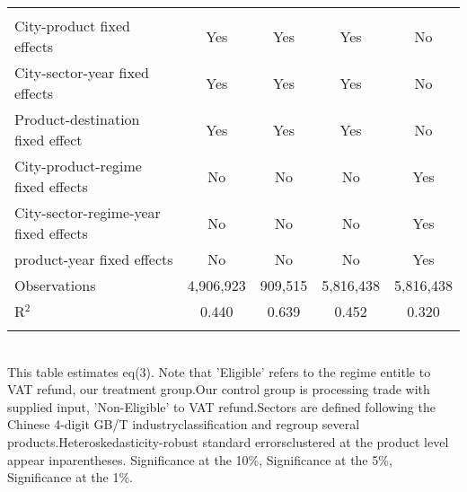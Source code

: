 \documentclass[preview]{standalone}
\begin{document}
\begin{table}[!htbp]
\begin{adjustbox}{width=\textwidth, totalheight=\baselineskip,keepaspectratio}
\begin{tabular}{@{\extracolsep{5pt}}lcccc}
 \hline \\[-1.8ex] 
City-product fixed effects & Yes & Yes & Yes & No \\ 
City-sector-year fixed effects & Yes & Yes & Yes & No \\ 
Product-destination fixed effect & Yes & Yes & Yes & No \\ 
City-product-regime fixed effects & No & No & No & Yes \\ 
City-sector-regime-year fixed effects & No & No & No & Yes \\ 
product-year fixed effects & No & No & No & Yes \\ 
Observations & 4,906,923 & 909,515 & 5,816,438 & 5,816,438 \\ 
R$^{2}$ & 0.440 & 0.639 & 0.452 & 0.320 \\ 
\hline 
\hline \\[-1.8ex] 
\end{tabular}
\end{adjustbox}
\begin{tablenotes} 
 \small 
 \item \\ 
This table estimates eq(3). Note that 'Eligible' refers to the regime entitle to VAT refund, our treatment group.Our control group is processing trade with supplied input, 'Non-Eligible' to VAT refund.Sectors are defined following the Chinese 4-digit GB/T industryclassification and regroup several products.Heteroskedasticity-robust standard errorsclustered at the product level appear inparentheses.\sym{*} Significance at the 10\%, \sym{**} Significance at the 5\%, \sym{***} Significance at the 1\%. 
\end{tablenotes}
\end{table}
\end{document}
